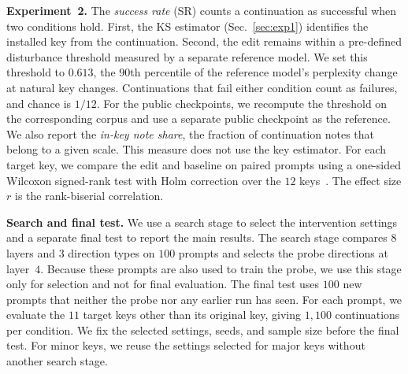 \documentclass{article}
\begin{document}
\noindent\textbf{Experiment~2.}
The \emph{success rate} (SR) counts a continuation as successful when two conditions hold.
First, the KS estimator (Sec.~\ref{sec:exp1}) identifies the installed key from the continuation.
Second, the edit remains within a pre-defined disturbance threshold measured by a separate reference model.
We set this threshold to $0.613$, the $90$th percentile of the reference model's perplexity change at natural key changes.
Continuations that fail either condition count as failures, and chance is $1/12$.
For the public checkpoints, we recompute the threshold on the corresponding corpus and use a separate public checkpoint as the reference.
We also report the \emph{in-key note share}, the fraction of continuation notes that belong to a given scale.
This measure does not use the key estimator. For each target key, we compare the edit and baseline on paired prompts using a one-sided Wilcoxon signed-rank test with Holm correction over the $12$ keys~\cite{holm1979}.
The effect size $r$ is the rank-biserial correlation.

\noindent\textbf{Search and final test.}
We use a search stage to select the intervention settings and a separate final test to report the main results.
The search stage compares $8$ layers and $3$ direction types on $100$ prompts and selects the probe directions at layer~$4$.
Because these prompts are also used to train the probe, we use this stage only for selection and not for final evaluation.
The final test uses $100$ new prompts that neither the probe nor any earlier run has seen.
For each prompt, we evaluate the $11$ target keys other than its original key, giving $1{,}100$ continuations per condition.
We fix the selected settings, seeds, and sample size before the final test.
For minor keys, we reuse the settings selected for major keys without another search stage.
\end{document}
